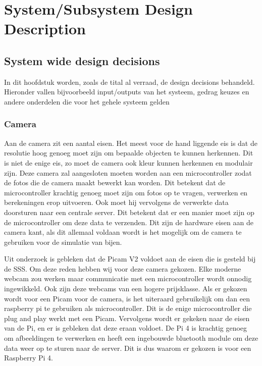 \section{System/Subsystem Design Description}

\subsection{System wide design decisions}
In dit hoofdstuk worden, zoals de tital al verraad, de design decisions behandeld. Hieronder vallen bijvoorbeeld 
input/outputs van het systeem, gedrag keuzes en andere onderdelen die voor het gehele systeem gelden


\subsubsection{Camera}
Aan de camera zit een aantal eisen. Het meest voor de hand liggende eis is dat de resolutie hoog genoeg moet zijn
om bepaalde objecten te kunnen herkennen. Dit is niet de enige eis, zo moet de camera ook kleur kunnen herkennen 
en modulair zijn. Deze camera zal aangesloten moeten worden aan een microcontroller 
zodat de fotos die de camera maakt bewerkt kan worden. Dit betekent dat de microcontroller krachtig genoeg moet zijn 
om fotos op te vragen, verwerken en berekeningen erop uitvoeren. Ook moet hij vervolgens de verwerkte data doorsturen 
naar een centrale server. Dit betekent dat er een manier moet zijn op de microcontroller om deze data te verzenden.
Dit zijn de hardware eisen aan de camera kant, als dit allemaal voldaan wordt is het mogelijk om de camera te 
gebruiken voor de simulatie van bijen.

Uit onderzoek is gebleken dat de Picam V2 voldoet aan de eisen die is gesteld bij de SSS. 
Om deze reden hebben wij voor deze camera gekozen. Elke moderne webcam zou werken maar communicatie met een 
microcontroller wordt onnodig ingewikkeld. Ook zijn deze webcams van een hogere prijsklasse.
Als er gekozen wordt voor een Picam voor de camera, is het uiteraard gebruikelijk om dan een raspberry pi 
te gebruiken als microcontroller. Dit is de enige microcontroller die plug and play werkt met een Picam. 
Vervolgens wordt er gekeken naar de eisen van de Pi, en er is gebleken dat deze eraan voldoet. 
De Pi 4 is krachtig genoeg om afbeeldingen te verwerken en heeft een ingebouwde bluetooth module 
om deze data weer op te sturen naar de server. Dit is dus waarom er gekozen is voor een Raspberry Pi 4.


\newpage

